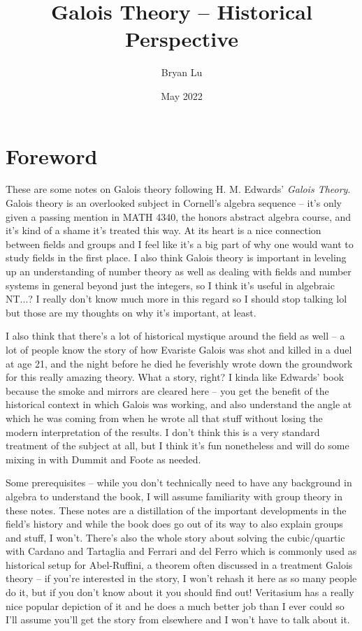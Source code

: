 \documentclass[12pt]{scrartcl}
\title{Galois Theory -- Historical Perspective}
\author{Bryan Lu}
\date{May 2022} %
\begin{document}
\maketitle

\setcounter{section}{-1}
\section{Foreword}
These are some notes on Galois theory following H. M. Edwards' \textit{Galois Theory}. Galois theory is an overlooked subject in Cornell's algebra sequence -- it's only given a passing mention in MATH 4340, the honors abstract algebra course, and it's kind of a shame it's treated this way. At its heart is a nice connection between fields and groups and I feel like it's a big part of why one would want to study fields in the first place. I also think Galois theory is important in leveling up an understanding of number theory as well as dealing with fields and number systems in general beyond just the integers, so I think it's useful in algebraic NT...? I really don't know much more in this regard so I should stop talking lol but those are my thoughts on why it's important, at least.

I also think that there's a lot of historical mystique around the field as well -- a lot of people know the story of how Evariste Galois was shot and killed in a duel at age 21, and the night before he died he feverishly wrote down the groundwork for this really amazing theory. What a story, right? I kinda like Edwards' book because the smoke and mirrors are cleared here -- you get the benefit of the historical context in which Galois was working, and also understand the angle at which he was coming from when he wrote all that stuff without losing the modern interpretation of the results. I don't think this is a very standard treatment of the subject at all, but I think it's fun nonetheless and will do some mixing in with Dummit and Foote as needed.

Some prerequisites -- while you don't technically need to have any background in algebra to understand the book, I will assume familiarity with group theory in these notes. These notes are a distillation of the important developments in the field's history and while the book does go out of its way to also explain groups and stuff, I won't. There's also the whole story about solving the cubic/quartic with Cardano and Tartaglia and Ferrari and del Ferro which is commonly used as historical setup for Abel-Ruffini, a theorem often discussed in a treatment Galois theory -- if you're interested in the story, I won't rehash it here as so many people do it, but if you don't know about it you should find out! Veritasium has a really nice popular depiction of it and he does a much better job than I ever could so I'll assume you'll get the story from elsewhere and I won't have to talk about it.
\end{document}
